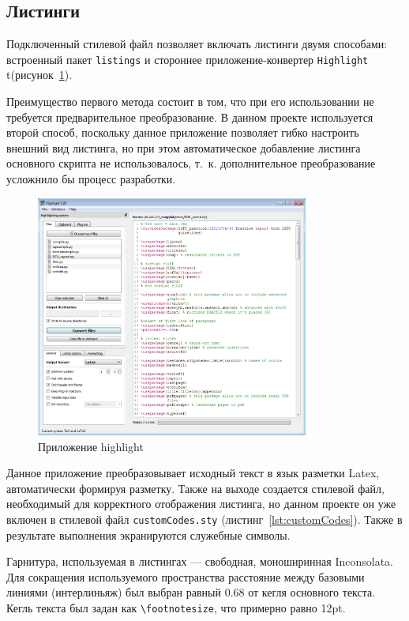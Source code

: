 \subsection{Листинги}
\label{sec:listings}

Подключенный стилевой файл позволяет включать листинги двумя способами: встроенный пакет \texttt{listings} и стороннее приложение-конвертер \texttt{Highlight} t(рисунок~\ref{fig:highlight}).

Преимущество первого метода состоит в том, что при его использовании не требуется предварительное преобразование. В данном проекте используется второй способ, поскольку данное приложение позволяет гибко настроить внешний вид листинга, но при этом автоматическое добавление листинга основного скрипта не использовалось, т.~к. дополнительное преобразование усложнило бы процесс разработки.

\begin{figure}[H]
	\centering
	\includegraphics[width=0.8\textwidth]{pics/highlight.png}
	\caption{Приложение highlight}
	\label{fig:highlight}
\end{figure}

Данное приложение преобразовывает исходный текст в язык разметки Latex, автоматически формируя разметку. Также на выходе создается стилевой файл, необходимый для корректного отображения листинга, но данном проекте он уже включен в стилевой файл \texttt{customCodes.sty} (листинг~\ref{lst:customCodes}). Также в результате выполнения экранируются служебные символы.

Гарнитура, используемая в листингах --- свободная, моноширинная Inconsolata. Для сокращения используемого пространства расстояние между базовыми линиями (интерлиньяж) был выбран равный 0.68 от кегля основного текста. Кегль текста был задан как \texttt{\textbackslash footnotesize}, что примерно равно 12pt.

